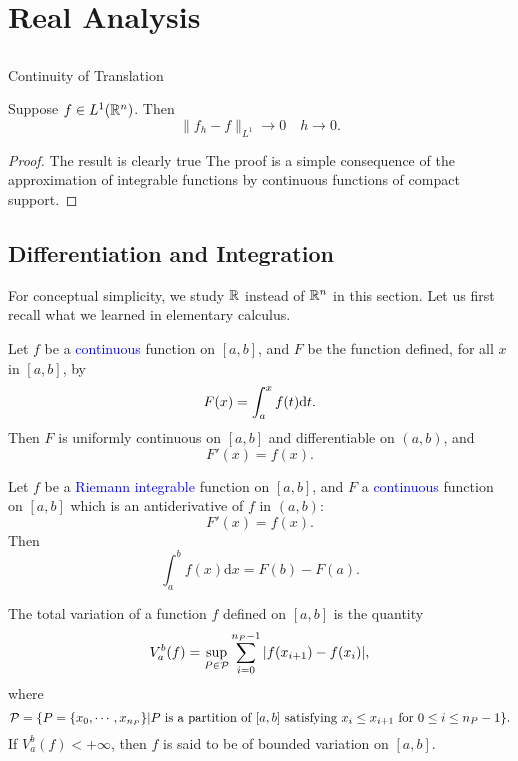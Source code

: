 \chapter{Real Analysis}


\section{}

Continuity of Translation

\begin{theorem}
    Suppose $f\in L^1(\mathbb{R}^n)$. Then 
    $$\|f_h-f\|_{L^1}\to 0 \quad h\to 0 .$$
\end{theorem}
\begin{proof}
    The result is clearly true
    The proof is a simple consequence of the approximation of integrable functions by continuous functions of compact support.
\end{proof}

\section{Differentiation and Integration}
For conceptual simplicity, we study $\mathbb{R}$ instead of $\mathbb{R}^n$ in this section.
Let us first recall what we learned in elementary calculus.

\begin{theorem}
    Let \( f \) be a \textcolor{blue}{continuous} function on \([a,b]\),
    and $F$ be the function defined, for all $x$ in $[a,b]$, by
    $$F(x)=\int_a^x f(t)\mathrm{d} t.$$
    Then $F$ is uniformly continuous on $[a,b]$ and differentiable on $(a,b)$, and $$F'(x)=f(x).$$  
\end{theorem}

\begin{theorem}\label{thm:newton-leibniz}
    Let \( f \) be a \textcolor{blue}{Riemann integrable} function on \([a,b]\),
    and $F$ a \textcolor{blue}{continuous} function on $[a,b]$ which is an antiderivative of $f$ in $(a,b)$:
    $$F'(x)=f(x).$$
    Then $$\int_a^b f(x)\mathrm{d}x=F(b)-F(a).$$  
\end{theorem}


\begin{definition}
    The total variation of a function $f$ defined on $[a,b]$ is the quantity
    $$ V_a^b(f)=\sup_{P\in\mathcal{P}}\sum_{i=0}^{n_P-1}|f(x_{i+1})-f(x_i)|,$$
    where
    $$\mathcal{P}=\{P=\{x_0,\cdots,x_{n_P}\}| P \text{ is a partition of }[a,b]\text{ satisfying }x_i\leq x_{i+1}\text{ for }0\leq i\leq n_P-1\}.$$
    If $V_a^b(f)<+\infty$, then $f$ is said to be of bounded variation on $[a,b]$.
\end{definition}

